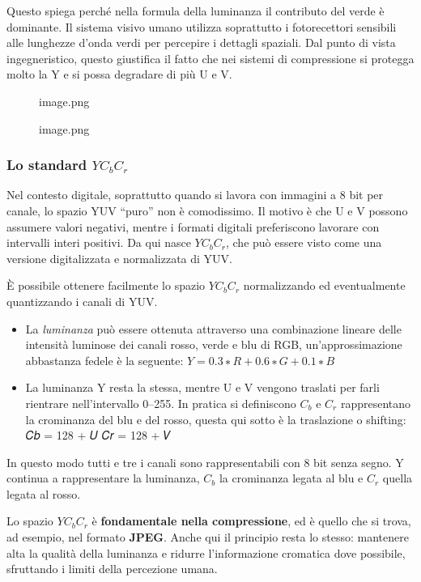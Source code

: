 \documentclass[
]{article}
\providecommand{\tightlist}{%
  \setlength{\itemsep}{0pt}\setlength{\parskip}{0pt}}
\begin{document}
Questo spiega perché nella formula della luminanza il contributo del verde è dominante. Il sistema visivo umano utilizza soprattutto i fotorecettori sensibili alle lunghezze d'onda verdi per percepire i dettagli spaziali. Dal punto di vista ingegneristico, questo giustifica il fatto che nei sistemi di compressione si protegga molto la Y e si possa degradare di più U e V.

\begin{figure}
\centering
{image.png}
\caption{image.png}
\end{figure}

\hypertarget{lo-standard-yc_bc_r}{%
\subsubsection{\texorpdfstring{Lo standard \(YC_{b}C_{r}\)}{Lo standard YC\_\{b\}C\_\{r\}}}\label{lo-standard-yc_bc_r}}

Nel contesto digitale, soprattutto quando si lavora con immagini a 8 bit per canale, lo spazio YUV ``puro'' non è comodissimo. Il motivo è che U e V possono assumere valori negativi, mentre i formati digitali preferiscono lavorare con intervalli interi positivi.
Da qui nasce \(YC_{b}C_{r}\), che può essere visto come una versione digitalizzata e normalizzata di YUV.

È possibile ottenere facilmente lo spazio \(YC_{b}C_{r}\) normalizzando ed eventualmente quantizzando i canali di YUV.

\begin{itemize}
\tightlist
\item
  La \emph{luminanza} può essere ottenuta attraverso una combinazione lineare delle intensità luminose dei canali rosso, verde e blu di RGB, un'approssimazione abbastanza fedele è la seguente:
  \(𝑌 = 0.3 ∗ 𝑅 + 0.6 ∗ 𝐺 + 0.1 ∗ 𝐵\)
\item
  La luminanza Y resta la stessa, mentre U e V vengono traslati per farli rientrare nell'intervallo 0--255. In pratica si definiscono \(C_{b}\) e \(C_{r}\) rappresentano la crominanza del blu e del rosso, questa qui sotto è la traslazione o shifting:
  𝐶𝑏 = 128 + 𝑈
  𝐶𝑟 = 128 + 𝑉
\end{itemize}

In questo modo tutti e tre i canali sono rappresentabili con 8 bit senza segno. Y continua a rappresentare la luminanza, \(C_b\) la crominanza legata al blu e \(C_r\) quella legata al rosso.

Lo spazio \(YC_{b}C_{r}\) è \textbf{fondamentale nella compressione}, ed è quello che si trova, ad esempio, nel formato \textbf{JPEG}. Anche qui il principio resta lo stesso: mantenere alta la qualità della luminanza e ridurre l'informazione cromatica dove possibile, sfruttando i limiti della percezione umana.
\end{document}
